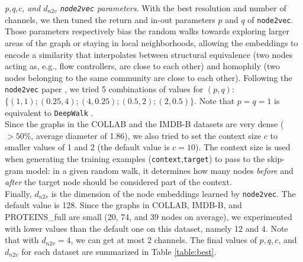 \documentclass[runningheads]{llncs}
\begin{document}
\textit{p,q,c, and $d_{n2v}$ \texttt{node2vec} parameters}. With the best resolution and number of channels, we then tuned the return and in-out parameters $p$ and $q$ of \texttt{node2vec}. Those parameters respectively bias the random walks towards exploring larger areas of the graph or staying in local neighborhoods, allowing the embeddings to encode a similarity that interpolates between structural equivalence (two nodes acting as, e.g., flow controllers, are close to each other) and homophily (two nodes belonging to the same community are close to each other). Following the \texttt{node2vec} paper \cite{grover2016node2vec}, we tried 5 combinations of values for $(p,q)$: $\big\{(1,1);(0.25,4);(4,0.25);(0.5,2);(2,0.5)\big\}$. Note that $p=q=1$ is equivalent to \texttt{DeepWalk} \cite{perozzi2014deepwalk}.\\
Since the graphs in the COLLAB and the IMDB-B datasets are very dense ($>50\%$, average diameter of 1.86), we also tried to set the context size $c$ to smaller values of 1 and 2 (the default value is $c=10$). The context size is used when generating the training examples (\texttt{context},\texttt{target}) to pass to the skip-gram model: in a given random walk, it determines how many nodes \textit{before} and \textit{after} the target node should be considered part of the context.\\
Finally, $d_{n2v}$ is the dimension of the node embeddings learned by \texttt{node2vec}. The default value is 128. Since the graphs in COLLAB, IMDB-B, and PROTEINS\_full are small (20, 74, and 39 nodes on average), we experimented with lower values than the default one on this dataset, namely 12 and 4. Note that with $d_{n2v}=4$, we can get at most 2 channels. The final values of $p,q,c$, and $d_{n2v}$ for each dataset are summarized in Table \ref{table:best}. 

\vspace{-0.25cm}

\begin{table}[h]
\begin{center}
\end{center}
\captionsetup{justification=centering, size=small}
\caption{Final resolution, number of channels, and $p,q,c$, and $d_{n2v}$ \texttt{node2vec} parameters for each dataset. $^\star$number of channels for node embeddings and continuous node attributes. - means default value(s).}
\label{table:best}
\end{table}
\end{document}
